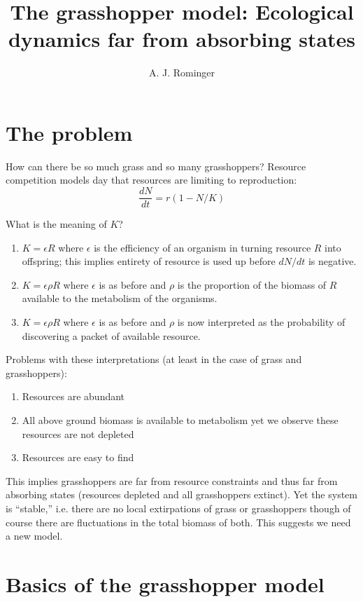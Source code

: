 \documentclass[12pt]{article}
\title{The grasshopper model: Ecological dynamics far from absorbing states}
\author{A. J. Rominger}
\date{}
\begin{document}
\maketitle

\section{The problem}

How can there be so much grass and so many grasshoppers? Resource
competition models day that resources are limiting to reproduction:
\begin{equation}
  \label{eq:lotka}
  \frac{dN}{dt} = r(1 - N/K)
\end{equation}

What is the meaning of $K$?
\begin{enumerate}
\item $K = \epsilon R$ where $\epsilon$ is the efficiency of an
  organism in turning resource $R$ into offspring; this implies
  entirety of resource is used up before $dN/dt$ is negative.
\item $K = \epsilon \rho R$ where $\epsilon$ is as before and $\rho$
  is the proportion of the biomass of $R$ available to the metabolism
  of the organisms.
\item $K = \epsilon \rho R$ where $\epsilon$ is as before and $\rho$
  is now interpreted as the probability of discovering a packet of
  available resource.
\end{enumerate}

Problems with these interpretations (at least in the case of grass and
grasshoppers):
\begin{enumerate}
\item Resources are abundant
\item All above ground biomass is available to metabolism yet we
  observe these resources are not depleted
\item Resources are easy to find
\end{enumerate}

This implies grasshoppers are far from resource constraints and thus
far from absorbing states (resources depleted and all grasshoppers
extinct). Yet the system is ``stable,'' i.e. there are no local
extirpations of grass or grasshoppers though of course there are
fluctuations in the total biomass of both.  This suggests we need a
new model.

\section{Basics of the grasshopper model}
\end{document}
